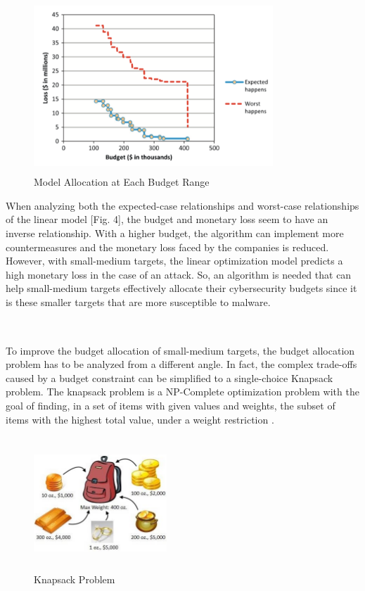 \begin{figure}[ht]%
\centering
\includegraphics[width=9cm,height=6.5cm]{Images/linear-optimization.png}
\caption{Model Allocation at Each Budget Range \cite{rakes_it_2012}}%
\end{figure}

When analyzing both the expected-case relationships and worst-case relationships of the linear model [Fig. 4], the budget and monetary loss seem to have an inverse relationship. With a higher budget, the algorithm can implement more countermeasures and the monetary loss faced by the companies is reduced. However, with small-medium targets, the linear optimization model predicts a high monetary loss in the case of an attack. So, an algorithm is needed that can help small-medium targets effectively allocate their cybersecurity budgets since it is these smaller targets that are more susceptible to malware.

\subsection*{\color{SubSectionBlue}{Knapsack Problem}}
 \\

To improve the budget allocation of small-medium targets, the budget allocation problem has to be analyzed from a different angle. In fact, the complex trade-offs caused by a budget constraint can be simplified to a single-choice Knapsack problem. The knapsack problem is a NP-Complete optimization problem with the goal of finding, in a set of items with given values and weights, the subset of items with the highest total value, under a weight restriction \cite{murawski_how_2016}.

\begin{figure}[ht]%
\centering
\includegraphics[width=5cm,height=5cm]{Images/knapsack-graphic.jpeg}
\caption{Knapsack Problem \cite{pan_comparison_2018}}%
\end{figure}

